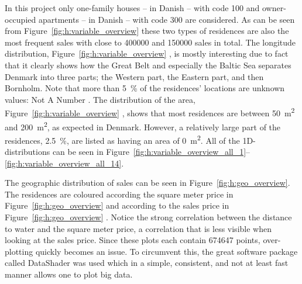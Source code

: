 In this project only one-family houses --  in Danish -- with code \num{100} and owner-occupied apartments --  in Danish -- with code 300 are considered. As can be seen from Figure~\ref{fig:h:variable_overview}  these two types of residences are also the most frequent sales with close to \num{400000} and \num{150000} sales in total. The longitude distribution, Figure~\ref{fig:h:variable_overview} , is mostly interesting due to fact that it clearly shows how the Great Belt and especially the Baltic Sea separates Denmark into three parts; the Western part, the Eastern part, and then Bornholm. Note that more than \SI{5}{\percent} of the residences' locations are unknown values: Not A Number . The distribution of the area, Figure~\ref{fig:h:variable_overview} , shows that most residences are between \SI{50}{\meter^2} and \SI{200}{\meter^2}, as expected in Denmark. However, a relatively large part of the residences, \SI{2.5}{\percent}, are listed as having an area of \SI{0}{\meter^2}. All of the 1D-distributions can be seen in Figure~\ref{fig:h:variable_overview_all_1}--\ref{fig:h:variable_overview_all_14}. 

The geographic distribution of sales can be seen in Figure~\ref{fig:h:geo_overview}. The residences are coloured according the square meter price in Figure~\ref{fig:h:geo_overview}  and according to the sales price in Figure~\ref{fig:h:geo_overview} . Notice the strong correlation between the distance to water and the square meter price, a correlation that is less visible when looking at the sales price. Since these plots each contain \num{674647} points, over-plotting quickly becomes an issue. To circumvent this, the great software package called DataShader was used \autocite{bednarDatashaderRevealingStructure2019} which in a simple, consistent, and not at least fast manner allows one to plot big data.


